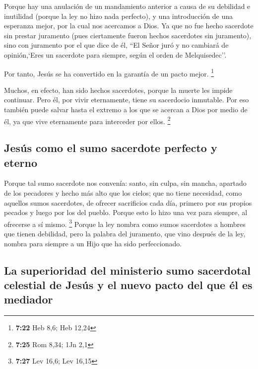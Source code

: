  Porque hay una anulación de un mandamiento anterior a
causa de su debilidad e inutilidad  (porque la ley no
hizo nada perfecto), y una introducción de una esperanza mejor, por la
cual nos acercamos a Dios.  Ya que no fue hecho sacerdote
sin prestar juramento  (pues ciertamente fueron hechos
sacerdotes sin juramento), sino con juramento por el que dice de él,
``El Señor juró y no cambiará de opinión,`Eres un sacerdote para
siempre, según el orden de Melquisedec''.

 Por tanto, Jesús se ha convertido en la garantía de un
pacto mejor. \footnote{\textbf{7:22} Heb 8,6; Heb 12,24}

 Muchos, en efecto, han sido hechos sacerdotes, porque la
muerte les impide continuar.  Pero él, por vivir
eternamente, tiene su sacerdocio inmutable.  Por eso
también puede salvar hasta el extremo a los que se acercan a Dios por
medio de él, ya que vive eternamente para interceder por ellos.
\footnote{\textbf{7:25} Rom 8,34; 1Jn 2,1}

\hypertarget{jesuxfas-como-el-sumo-sacerdote-perfecto-y-eterno}{%
\subsection{Jesús como el sumo sacerdote perfecto y
eterno}\label{jesuxfas-como-el-sumo-sacerdote-perfecto-y-eterno}}

 Porque tal sumo sacerdote nos convenía: santo, sin
culpa, sin mancha, apartado de los pecadores y hecho más alto que los
cielos;  que no tiene necesidad, como aquellos sumos
sacerdotes, de ofrecer sacrificios cada día, primero por sus propios
pecados y luego por los del pueblo. Porque esto lo hizo una vez para
siempre, al ofrecerse a sí mismo. \footnote{\textbf{7:27} Lev 16,6; Lev
  16,15}  Porque la ley nombra como sumos sacerdotes a
hombres que tienen debilidad, pero la palabra del juramento, que vino
después de la ley, nombra para siempre a un Hijo que ha sido
perfeccionado.

\hypertarget{la-superioridad-del-ministerio-sumo-sacerdotal-celestial-de-jesuxfas-y-el-nuevo-pacto-del-que-uxe9l-es-mediador}{%
\subsection{La superioridad del ministerio sumo sacerdotal celestial de
Jesús y el nuevo pacto del que él es
mediador}\label{la-superioridad-del-ministerio-sumo-sacerdotal-celestial-de-jesuxfas-y-el-nuevo-pacto-del-que-uxe9l-es-mediador}}

